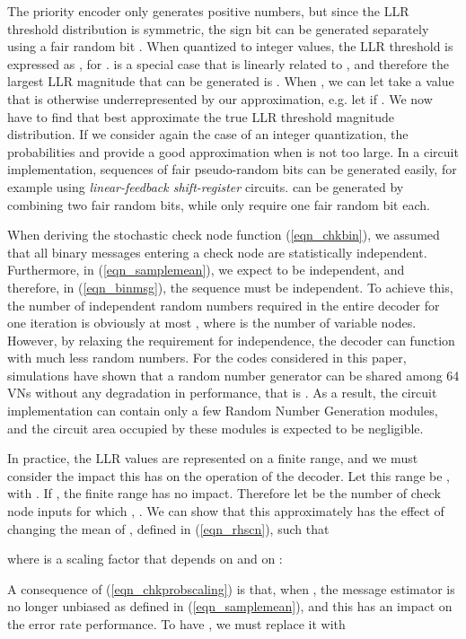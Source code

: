 \documentclass[12pt,journal,twoside,draftcls,onecolumn]{IEEEtran}
\begin{document}
	The priority encoder only generates positive numbers, but since the LLR threshold distribution is symmetric, the sign bit can be generated separately using a fair random bit .
	When quantized to integer values, the LLR threshold is expressed as , for .  is a special case that is linearly related to , and therefore the largest LLR magnitude that can be generated is . When , we can let  take a value that is otherwise underrepresented by our approximation, e.g. let  if .
	We now have to find  that best approximate the true LLR threshold magnitude distribution. If we consider again the case of an integer quantization, the probabilities  and  provide a good approximation when  is not too large. 
	In a circuit implementation, sequences of fair pseudo-random bits can be generated easily, for example using \emph{linear-feedback shift-register} circuits.  can be generated by combining two fair random bits, while  only require one fair random bit each.
		
	When deriving the stochastic check node function (\ref{eqn_chkbin}), we assumed that all binary messages entering a check node are statistically independent. Furthermore, in (\ref{eqn_samplemean}), we expect  to be independent, and therefore, in (\ref{eqn_binmsg}), the sequence  must be independent.
	To achieve this, the number  of independent random numbers required in the entire decoder for one iteration is obviously at most , where  is the number of variable nodes.
	However, by relaxing the requirement for independence, the decoder can function with much less random numbers. For the codes considered in this paper, simulations have shown that a random number generator can be shared among 64 VNs without any degradation in performance, that is . 
	As a result, the circuit implementation can contain only a few Random Number Generation modules, and the circuit area occupied by these modules is expected to be negligible.
	
	In practice, the LLR values  are represented on a finite range, and we must consider the impact this has on the operation of the decoder. Let this range be , with . If , the finite range has no impact. Therefore let  be the number of check node inputs for which , . We can show that this approximately has the effect of changing the mean of , defined in (\ref{eqn_rhscn}), such that
	
	where  is a scaling factor that depends on  and on :
	
	A consequence of (\ref{eqn_chkprobscaling}) is that, when , the message estimator  is no longer unbiased as defined in (\ref{eqn_samplemean}), and this has an impact on the error rate performance. To have , we must replace it with
	
\end{document}
